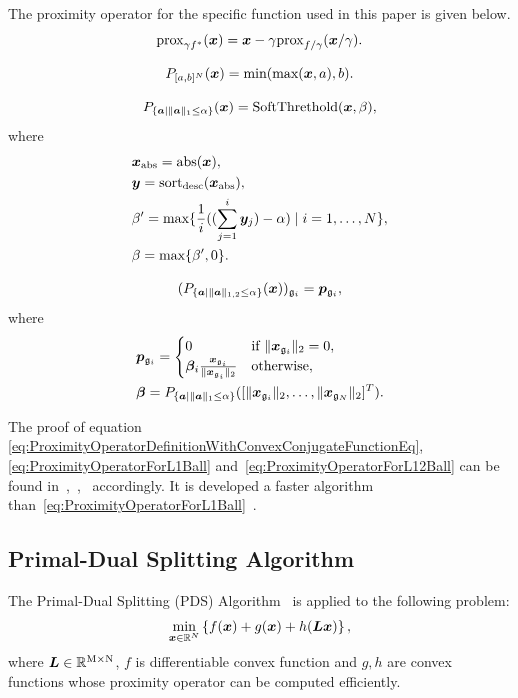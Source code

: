 The proximity operator for the specific function used in this paper is given below.
\begin{equation} \label{eq:ProximityOperatorDefinitionWithConvexConjugateFunctionEq} \proximityOperatorDefinitionWithConvexConjugateFunction. \end{equation}

\begin{equation} \label{eq:ProximityOperatorForBoxConstraint} \projBoxSolution. \end{equation}

\begin{equation} \label{eq:ProximityOperatorForL1Ball}  \projLOneBallSolution, \end{equation}
where
\begin{equation} \label{eq:ProximityOperatorForL1BallWhere} \projLOneBallSolutionWhere \notag \end{equation}

\begin{equation} \label{eq:ProximityOperatorForL12Ball} \projLOneTwoBallSolution, \end{equation}
where
\begin{equation} \label{eq:ProximityOperatorForL12BallWhere} \projLOneTwoBallSolutionWhere \notag \end{equation}

The proof of equation \eqref{eq:ProximityOperatorDefinitionWithConvexConjugateFunctionEq}, \eqref{eq:ProximityOperatorForL1Ball} and~\eqref{eq:ProximityOperatorForL12Ball} can be found in~\cite[Theorem 3.1 (ii)]{prox-convex-conjugate-function},~\cite{L1-ball-projection},~\cite{L12-ball-projection} accordingly.
It is developed a faster algorithm than~\eqref{eq:ProximityOperatorForL1Ball}~\cite{fast-L1-ball-projection}.

\subsection{Primal-Dual Splitting Algorithm}\label{subsec:primal-dual-splitting-algorithm}
The Primal-Dual Splitting (PDS) Algorithm~\cite{PDS0,PDS1,PDS2,PDS3} is applied to the following problem:
\begin{equation} \label{eq:PDSPrimalEq} \PDSPrimal, \end{equation}
where $\bm{L} \in \realNumber^{\intM \times \intN}$, $f$ is differentiable convex function and $g,h$ are convex functions whose proximity operator can be computed efficiently.

